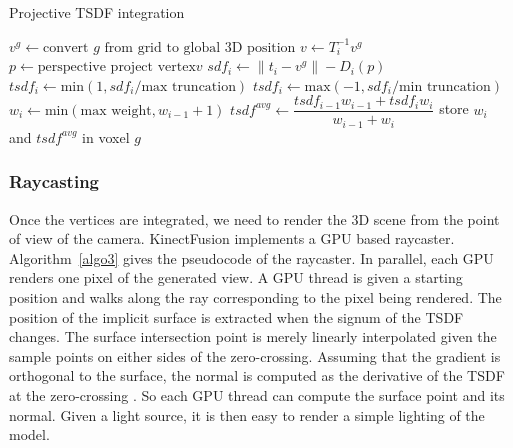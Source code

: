 \documentclass[12pt]{article}
\begin{document}
\begin{algorithm}
\caption{Projective TSDF integration}\label{algo2}
\begin{algorithmic}[1]
  \State $v^g \gets \text{convert }g\text{ from grid to global 3D position}$
  \State $v \gets T_i^{-1}v^g$
  \State $p \gets \text{perspective project vertex} v$
    \State $sdf_i \gets \left\|t_i-v^{g}\right\| - D_i(p)$
      \State $tsdf_i \gets \text{min}(1, sdf_i/\text{max truncation})$
      \Else
      \State $tsdf_i \gets \text{max}(-1, sdf_i/\text{min truncation})$
      \EndIf
    \State $w_i \gets \text{min}(\text{max weight}, w_{i-1}+1)$
    \State $tsdf^{avg} \gets \dfrac{tsdf_{i-1}w_{i-1}+tsdf_iw_i}{w_{i-1}+w_i}$
    \State store $w_i$ and $tsdf^{avg}$ in voxel $g$
    \EndIf
  \EndWhile
\EndFor
\end{algorithmic}
\end{algorithm}

\subsubsection{Raycasting}
Once the vertices are integrated, we need to render the 3D scene from the point of view of the camera. KinectFusion implements a GPU based raycaster. Algorithm~\ref{algo3} gives the pseudocode of the raycaster. In parallel, each GPU renders one pixel of the generated view. A GPU thread is given a starting position and walks along the ray corresponding to the pixel being rendered. The position of the implicit surface is extracted when the signum of the TSDF changes. The surface intersection point is merely linearly interpolated given the sample points on either sides of the zero-crossing. Assuming that the gradient is orthogonal to the surface, the normal is computed as the derivative of the TSDF at the zero-crossing \cite{SDF}. So each GPU thread can compute the surface point and its normal. Given a light source, it is then easy to render a simple lighting of the model.
\end{document}
